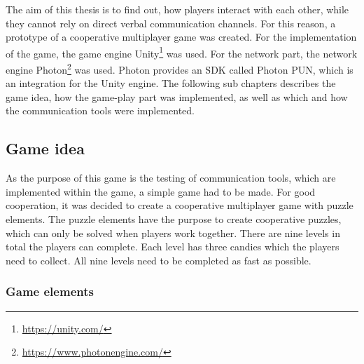 The aim of this thesis is to find out, how players interact with each other, while they cannot rely on direct verbal communication channels.
For this reason, a prototype of a cooperative multiplayer game was created.
For the implementation of the game, the game engine Unity\footnote{\url{https://unity.com/}}
was used. 
For the network part, the network engine Photon\footnote{\url{https://www.photonengine.com/}} was used. Photon provides an SDK called Photon PUN, which is an integration for the Unity engine.
The following sub chapters describes the game idea, how the game-play part was implemented, as well as which and how the communication tools were implemented.



\subsection{Game idea}
\label{section:Game idea}
As the purpose of this game is the testing of communication tools, which are implemented within the game, a simple game had to be made.
For good cooperation, it was decided to create a cooperative multiplayer game with puzzle elements. The puzzle elements have the purpose to create cooperative puzzles, which can only be solved when players work together. There are nine levels in total the players can complete. Each level has three candies which the players need to collect. All nine levels need to be completed as fast as possible.

\subsubsection{Game elements}
\label{section:Game elements}

